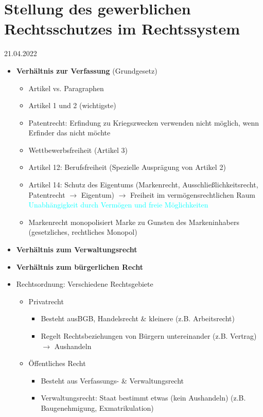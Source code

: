 \documentclass{report}
\begin{document}
\section{Stellung des gewerblichen Rechtsschutzes im Rechtssystem}
21.04.2022
\begin{itemize}
	\item \textbf{Verhältnis zur Verfassung} (Grundgesetz)
	\begin{itemize}
		\item Artikel vs. Paragraphen
		\item Artikel 1 und 2 (wichtigste)
		\item Patentrecht:
		\newline Erfindung zu Kriegszwecken verwenden nicht möglich, wenn Erfinder das nicht möchte
		\item Wettbewerbsfreiheit (Artikel 3)
		\item Artikel 12: Berufsfreiheit (Spezielle Ausprägung von Artikel 2)
		\item Artikel 14: Schutz des Eigentums (Markenrecht, Ausschließlichkeitsrecht, Patentrecht $\rightarrow$ Eigentum)
		\newline $\rightarrow$ Freiheit im vermögensrechtlichen Raum
		\newline \textcolor{cyan}{Unabhängigkeit durch Vermögen und freie Möglichkeiten}
		\item Markenrecht monopolisiert Marke zu Gunsten des Markeninhabers (gesetzliches, rechtliches Monopol)
	\end{itemize}
	\item \textbf{Verhältnis zum Verwaltungsrecht}
	\item \textbf{Verhältnis zum bürgerlichen Recht}
	\item Rechtsordnung: Verschiedene Rechtsgebiete
	\begin{itemize}
		\item Privatrecht
		\begin{itemize}
			\item Besteht ausBGB, Handelsrecht \& kleinere (z.B. Arbeitsrecht)
			\item Regelt Rechtsbeziehungen von Bürgern untereinander (z.B. Vertrag) $\rightarrow$ Aushandeln
		\end{itemize}
		\item Öffentliches Recht
		\begin{itemize}
			\item Besteht aus Verfassungs- \& Verwaltungsrecht
			\item Verwaltungsrecht: Staat bestimmt etwas (kein Aushandeln) (z.B. Baugenehmigung, Exmatrikulation)

\end{itemize}
\end{itemize}
\end{itemize}
\end{document}
